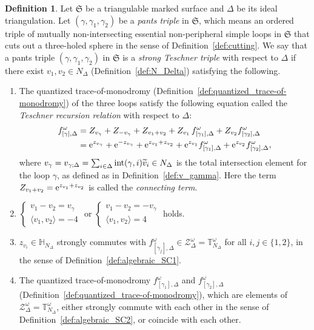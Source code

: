 \documentclass[10pt,a4paper]{amsart}
\numberwithin{equation}{section}
\theoremstyle{definition}
\newtheorem{Definition}[Theorem]{Definition}
\newcommand{\til}[1]{\widetilde{#1}}
\begin{document}
\begin{Definition}
\label{def:Teschner_triple_level1}
Let $\mathfrak{S}$ be a triangulable marked surface and $\Delta$ be its ideal triangulation. Let $(\gamma,\gamma_1,\gamma_2)$ be a {\em pants triple} in $\mathfrak{S}$, which means an ordered triple of mutually non-intersecting essential non-peripheral simple loops in $\mathfrak{S}$ that cuts out a three-holed sphere in the sense of Definition~\ref{def:cutting}.
We say that a pants triple $(\gamma,\gamma_1,\gamma_2)$ in $\mathfrak{S}$ is a {\em strong Teschner triple} with respect to $\Delta$ if there exist $v_1,v_2 \in N_\Delta$ (Definition~\ref{def:N_Delta}) satisfying the following.
\begin{enumerate}[label={\rm (TR\arabic*)}]\itemsep=0pt\setlength{\leftskip}{0.28cm}
\item\label{TR1} The quantized trace-of-monodromy (Definition~\ref{def:quantized_trace-of-monodromy}) of the three loops satisfy the following equation called the {\em Teschner recursion relation} with respect to $\Delta$:
\begin{align}
f^\omega_{[\gamma],\Delta}
& = Z_{v_\gamma} + Z_{-v_\gamma} + Z_{v_1+v_2} + Z_{v_1} \, f^\omega_{[\gamma_1],\Delta}
+ Z_{v_2} f^\omega_{[\gamma_2],\Delta} \nonumber\\
& = {\rm e}^{z_{v_\gamma}} + {\rm e}^{-z_{v_\gamma}} + {\rm e}^{z_{v_1} + z_{v_2}} + {\rm e}^{z_{v_1}} f^\omega_{[\gamma_1],\Delta} + {\rm e}^{z_{v_2}} f^\omega_{[\gamma_2],\Delta},\label{eq:TR1}
\end{align}
where $v_\gamma = v_{\gamma;\Delta} = \sum_{i\in \Delta} {\rm int}(\gamma,i) \til{v}_i \in N_\Delta$ is the total intersection element for the loop $\gamma$, as defined as in Definition~\ref{def:v_gamma}. Here the term $Z_{v_1+v_2} = {\rm e}^{z_{v_1} + z_{v_2}}$ is called the {\em connecting term}.
\item\label{TR2} $\begin{cases} v_1 - v_2 = v_\gamma \\ \langle v_1, v_2 \rangle = -4 \end{cases}$ or $\begin{cases} v_1 - v_2 = - v_\gamma \\ \langle v_1, v_2 \rangle = 4 \end{cases}$ holds.
\item\label{TR3} $z_{v_i} \in \mathbb{H}_{N_\Delta}$ strongly commutes with $f^\omega_{[\gamma_j],\Delta} \in \mathcal{Z}^\omega_\Delta = \mathbb{T}^\omega_{N_\Delta}$ for all $i,j\in\{1,2\}$, in the sense of Definition~\ref{def:algebraic_SC1}.
\item\label{TR4} The quantized trace-of-monodromy $f^\omega_{[\gamma_1],\Delta}$ and $f^\omega_{[\gamma_2],\Delta}$ (Definition~\ref{def:quantized_trace-of-monodromy}), which are elements of $\mathcal{Z}^\omega_\Delta = \mathbb{T}^\omega_{N_\Delta}$, either strongly commute with each other in the sense of Definition~\ref{def:algebraic_SC2}, or coincide with each other.
\end{enumerate}
\end{Definition}
\end{document}
